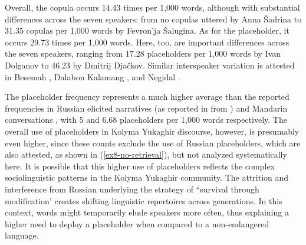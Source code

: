 \documentclass[output=paper,colorlinks,citecolor=brown
\ChapterDOI{10.5281/zenodo.15697581}
]{langscibook}
\begin{document}
Overall, the copula occurs 14.43 times per 1,000 words, although with substantial differences across the seven speakers: from no copulas uttered by Anna Šadrina to 31.35 copulas per 1,000 words by Fevron'ja Šalugina.
As for the placeholder, it occurs 29.73 times per 1,000 words.
Here, too, are important differences across the seven speakers, ranging from 17.28 placeholders per 1,000 words by Ivan Dolganov to 46.23 by Dmitrij Djačkov. 
Similar interspeaker variation is attested in Besemah \citep{chapters/mcdonnell_billings}, Dalabon \citep{chapters/ponsonnet} Kalamang \citep{chapters/visser}, and Negidal \citep{chapters/pakendorf}. 

The placeholder frequency represents a much higher average than the reported frequencies in Russian elicited narratives (as reported in \citealt{Podlesskaya2010} from \citealt{Podlesskaya&Kibrik2006}) and Mandarin conversations \citep{Zhao&Jurafsky2005}, with 5 and 6.68 placeholders per 1,000 words respectively. 
The overall use of placeholders in Kolyma Yukaghir discourse, however, is presumably even higher, since these counts exclude the use of Russian placeholders, which are also attested, as shown in (\ref{ex8-no-retrieval}), but not analyzed systematically here. 
It is possible that this higher use of placeholders reflects the complex sociolinguistic patterns in the Kolyma Yukaghir community.
The attrition and interference from Russian underlying the strategy of ``survival through modification' \citep[24]{Maslova2003} creates shifting linguistic repertoires across generations.
In this context, words might temporarily elude speakers more often, thus explaining a higher need to deploy a placeholder when compared to a non-endangered language. 

    

    

    
\end{document}
